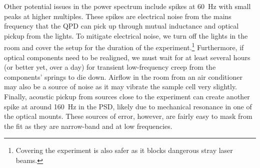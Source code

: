 \documentclass[hyperref={colorlinks=true, urlcolor=blue, citecolor=blue, final, bound}]{sfuthesis}
\begin{document}
Other potential issues in the power spectrum include spikes at \qty{60}{\hertz} with small peaks at higher multiples. These spikes are electrical noise from the mains frequency that the QPD can pick up through mutual inductance and optical pickup from the lights. To mitigate electrical noise, we turn off the lights in the room and cover the setup for the duration of the experiment.\footnote{Covering the experiment is also safer as it blocks dangerous stray laser beams.} Furthermore, if optical components need to be realigned, we must wait for at least several hours (or better yet, over a day) for transient low-frequency creep from the components' springs to die down. Airflow in the room from an air conditioner may also be a source of noise as it may vibrate the sample cell very slightly. Finally, acoustic pickup from sources close to the experiment can create another spike at around \qty{160}{\hertz} in the PSD, likely due to mechanical resonance in one of the optical mounts. These sources of error, however, are fairly easy to mask from the fit as they are narrow-band and at low frequencies.
\end{document}
